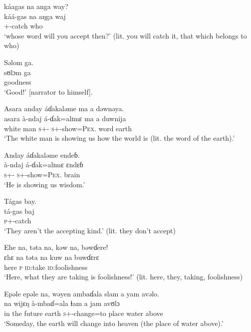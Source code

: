  \medskip
  káagas  na  anga  way?\\
 \gll káá-gas            na      aŋga     waj\\
 {\twoS}+{\POT}-catch    {\PSP}   {\POSS}  who\\
 \glt ‘whose word will you accept then?’ (lit. you will catch it, that which belongs to who)
 \z
 
\clearpage
 \ea Səlom  ga.  \\
 \gll sʊlɔm  ga \\
 goodness  {\ADJ}\\
 \glt ‘Good!’ [narrator to himself].
 \z

\ea Asara  anday  áɗakaləme  ma  a  dəwnəya.\\
 \gll asara   à-ndaj        á-ɗak=alɪmɛ               ma     a   duwnija\\
 {white man}     \textsc{s}+{\PFV}-{\PROG}  \textsc{s}+{\IFV}-show=\textsc{Pex}.{\IO}    word   {\GEN}    earth    \\
 \glt ‘The white man is showing us how the world is (lit. the word of the earth).’ 
 \z

\ea Anday  áɗakaləme  endeɓ.  \\
 \gll à-ndaj           á-ɗak=alɪmɛ     ɛndɛɓ \\
 \textsc{s}+{\PFV}-{\PROG}    \textsc{s}+{\IFV}-show=\textsc{Pex}.{\IO}  brain  \\
 \glt ‘He is showing us wisdom.’ 
 \z

\ea  Tágas  bay.\\
 \gll tá-gas     baj\\ 
 \textsc{p}+{\IFV}-catch  {\NEG}\\
 \glt ‘They aren’t the accepting kind.’ (lit. they don’t accept) 
 \z

\ea Ehe  na,  təta  na,  kəw  na,  bəwɗere!\\
 \gll ɛhɛ    na      təta   na       kuw      na  buwɗɛrɛ\\
 here   {\PSP}    \textsc{p}    {\PSP}    \textsc{id}:take   {\PSP}  \textsc{id}:foolishness\\
 \glt ‘Here, what they are taking is foolishness!’ (lit. here, they, taking, foolishness)
 \z

\ea Epəle epəle  na,  wəyen  ambaɗala  slam  a  yam  avəlo.\\
    na   wijɛŋ   à-mbaɗ=ala   ɬam   a   jam   avʊlɔ\\ 
 {in the future}  {\PSP}  earth  \textsc{s}+{\PFV}-change=to    place  {\GEN}  water  above\\
 \glt ‘Someday, the earth will change into heaven (the place of water above).’ 
 \z

